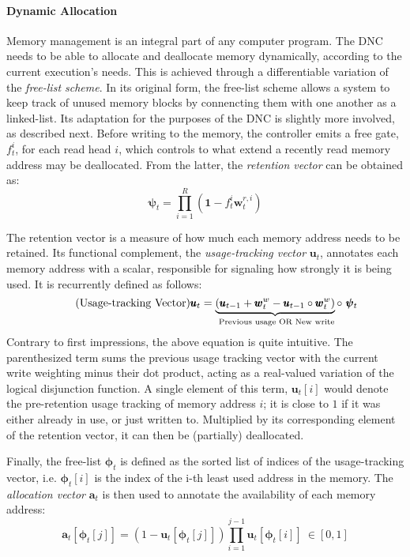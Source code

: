 \documentclass[]{article}
\begin{document}
\paragraph{Dynamic Allocation} Memory management is an integral part of any computer program. The DNC needs to be able to allocate and deallocate memory dynamically, according to the current execution's needs. This is achieved through a differentiable variation of the \textit{free-list scheme}. In its original form, the free-list scheme allows a system to keep track of unused memory blocks by connencting them with one another as a linked-list. Its adaptation for the purposes of the DNC is slightly more involved, as described next. Before writing to the memory, the controller emits a free gate, $f_t^i$, for each read head $i$, which controls to what extend a recently read memory address may be deallocated. From the latter, the \textit{retention vector} can be obtained as:
\[
\tag{Retention Vector}
\pmb{\psi}_t = \prod\limits_{i=1}^{R}{(\pmb{1}-f_t^i \pmb{w}_t^{r,i})}
\]

The retention vector is a measure of how much each memory address needs to be retained. Its functional complement, the \textit{usage-tracking vector} $\pmb{u}_t$, annotates each memory address with a scalar, responsible for signaling how strongly it is being used. It is recurrently defined as follows:
\[
\tag{Usage-tracking Vector}
\pmb{u}_t = \underbrace{(\pmb{u}_{t-1} + \pmb{w}_{t}^{w} - \pmb{u}_{t-1} \circ \pmb{w}_t^{w})}_{\text{ \scriptsize Previous usage OR New write}} \circ \ \pmb{\psi}_t
\]
Contrary to first impressions, the above equation is quite intuitive. The parenthesized term sums the previous usage tracking vector with the current write weighting minus their dot product, acting as a real-valued variation of the logical disjunction function. A single element of this term, $\pmb{u}_t[i]$ would denote the pre-retention usage tracking of memory address $i$; it is close to $1$ if it was either already in use, or just written to. Multiplied by its corresponding element of the retention vector, it can then be (partially) deallocated.
 
Finally, the free-list $\pmb{\phi}_t$ is defined as the sorted list of indices of the usage-tracking vector, i.e. $\pmb{\phi}_t[i]$ is the index of the i-th least used address in the memory. The \textit{allocation vector} $\pmb{a}_t$ is then  used to annotate the availability of each memory address:
\[
\tag{Allocation Vector}
\label{eqn:Allocation Vector}
\pmb{a}_t[\pmb{\phi}_t[j]] = (1 - \pmb{u}_t[\pmb{\phi}_t[j]])\prod\limits_{i=1}^{j-1}{\pmb{u}_t[\pmb{\phi}_t[i]]} \ \in [0,1]
\]
\end{document}
